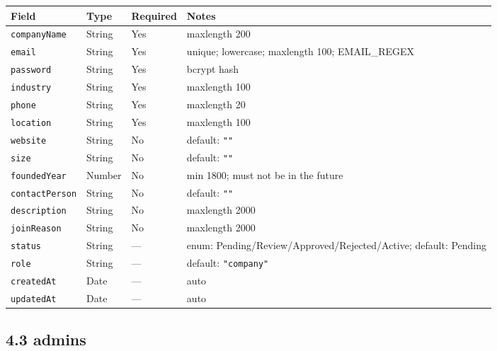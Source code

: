 \documentclass[12pt,a4paper]{article}
\begin{document}
\begin{longtable}{p{3.5cm}p{2.5cm}p{1.8cm}p{5.5cm}}
  \toprule
  \textbf{Field} & \textbf{Type} & \textbf{Required} & \textbf{Notes} \\
  \midrule
  \texttt{companyName}  & String & Yes & maxlength 200 \\
  \texttt{email}        & String & Yes & unique; lowercase; maxlength 100; EMAIL\_REGEX \\
  \texttt{password}     & String & Yes & bcrypt hash \\
  \texttt{industry}     & String & Yes & maxlength 100 \\
  \texttt{phone}        & String & Yes & maxlength 20 \\
  \texttt{location}     & String & Yes & maxlength 100 \\
  \texttt{website}      & String & No  & default: \texttt{""} \\
  \texttt{size}         & String & No  & default: \texttt{""} \\
  \texttt{foundedYear}  & Number & No  & min 1800; must not be in the future \\
  \texttt{contactPerson}& String & No  & default: \texttt{""} \\
  \texttt{description}  & String & No  & maxlength 2000 \\
  \texttt{joinReason}   & String & No  & maxlength 2000 \\
  \texttt{status}       & String & — & enum: Pending/Review/Approved/Rejected/Active; default: Pending \\
  \texttt{role}         & String & — & default: \texttt{"company"} \\
  \texttt{createdAt}    & Date   & — & auto \\
  \texttt{updatedAt}    & Date   & — & auto \\
  \bottomrule
\end{longtable}

\subsection*{4.3 admins}
\end{document}
